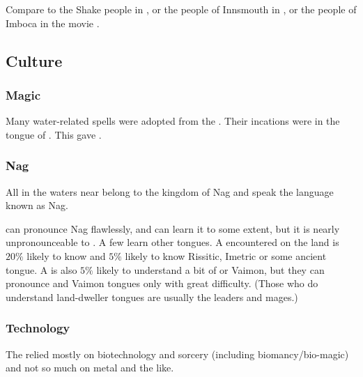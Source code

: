 Compare to the Shake people in \cite[pp.360--361]{StevenErikson:ReapersGale}, or the people of Innsmouth in , or the people of Imboca in the movie . 









\subsection{Culture}






\subsubsection{Magic}
Many water-related spells were adopted from the \nagae.
Their incations were in the tongue of .
This gave \VizicarDurasRespina {}.






\subsubsection{Nag}
All \nagae{} in the waters near \Azmith{} belong to the kingdom of Nag and speak the language known as Nag. 

\Dragons{} can pronounce Nag flawlessly, and \scathae{} can learn it to some extent, but it is nearly unpronounceable to \humans{}. 
A few \nagae{} learn other tongues. 
A \naga{} encountered on the land is $20\%$ likely to know \CommonDraconic and $5\%$ likely to know Rissitic, Imetric or some ancient \scathaese{} tongue. 
A \naga{} is also $5\%$ likely to understand a bit of \Velcadian{} or Vaimon, but they can pronounce \human{} and Vaimon tongues only with great difficulty. 
(Those \nagae{} who do understand land-dweller tongues are usually the leaders and mages.) 






\subsubsection{Technology}
The \nagae relied mostly on biotechnology and sorcery (including biomancy/bio-magic) and not so much on metal and the like. 

